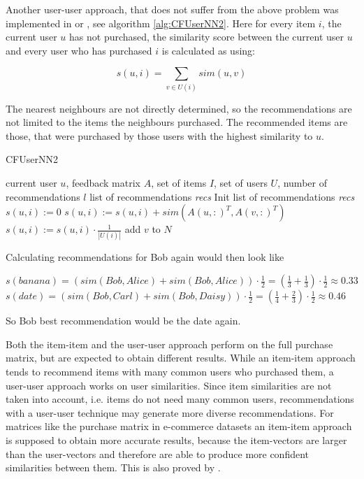 \documentclass[10pt]{reportMaster}
\begin{document}
Another user-user approach, that does not suffer from the above problem was implemented in \cite{efficientTopN} or \cite{effectiveLatentModels}, see algorithm \ref{alg:CFUserNN2}.
Here for every item $i$, the current user $u$ has not purchased, the similarity score between the current user $u$ and every user who has purchased $i$ is calculated as using: 

$$
s(u,i) = \sum_{v \in U(i)}{sim(u,v)}
$$

The nearest neighbours are not directly determined, so the recommendations are not limited to the items the neighbours purchased.
The recommended items are those, that were purchased by those users with the highest similarity to $u$.

\begin{algorithm}
	\caption[CFUserNN2]{CFUserNN2}
	\label{alg:CFUserNN2}
	\begin{algorithmic}[1]
		\Require current user $u$, feedback matrix $A$, set of items $I$, set of users $U$, number of recommendations $l$
		\Ensure list of recommendations \textit{recs}
		\State Init list of recommendations \textit{recs}
			\State $s(u,i) := 0$
				\State $s(u,i) := s(u,i) + sim(A(u,:)^T, A(v,:)^T)$
			\EndFor
			\State $s(u,i) := s(u,i) \cdot \frac{1}{|U(i)|}$
				\State add $v$ to $N$
			\EndIf
		\EndFor
	\end{algorithmic}	
\end{algorithm}

Calculating recommendations for Bob again would then look like

$s(banana) = (sim(Bob, Alice) + sim(Bob, Alice)) \cdot \frac{1}{2} = (\frac{1}{3} + \frac{1}{3}) \cdot \frac{1}{2} \approx 0.33$
$s(date) = (sim(Bob, Carl) + sim(Bob, Daisy)) \cdot \frac{1}{2} = (\frac{1}{4} + \frac{2}{3}) \cdot \frac{1}{2} \approx 0.46$

So Bob best recommendation would be the date again.

Both the item-item and the user-user approach perform on the full purchase matrix, but are expected to obtain different results.
While an item-item approach tends to recommend items with many common users who purchased them, a user-user approach works on user similarities.
Since item similarities are not taken into account, i.e. items do not need many common users, recommendations with a user-user technique may generate more diverse recommendations.
For matrices like the purchase matrix in e-commerce datasets an item-item approach is supposed to obtain more accurate results, because the item-vectors are larger than the user-vectors and therefore are able to produce more confident similarities between them.
This is also proved by \cite{itemItemAlgorithms}. 
\end{document}
